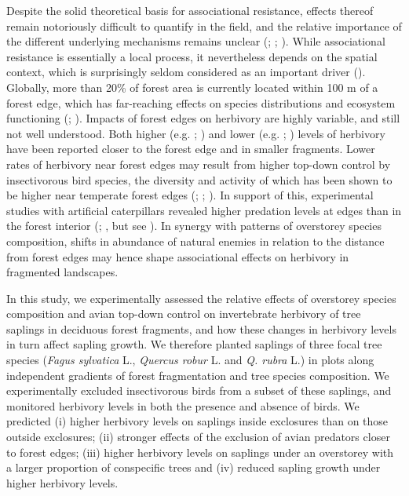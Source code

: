 \documentclass[b5paper,10pt]{book} %
\begin{document}
	Despite the solid theoretical basis for associational resistance, effects thereof remain notoriously difficult to quantify in the field, and the relative importance of the different underlying mechanisms remains unclear (\citealt{Barbosa2009}; \citealt{Muiruri2016}; \citealt{Grossman2018}). While associational resistance is essentially a local process, it nevertheless depends on the spatial context, which is surprisingly seldom considered as an important driver (\citealt{Nadrowski2010}). Globally, more than 20\% of forest area is currently located within 100 m of a forest edge, which has far-reaching effects on species distributions and ecosystem functioning (\citealt{Haddad2015}; \citealt{Pfeifer2017}). Impacts of forest edges on herbivory are highly variable, and still not well understood. Both higher (e.g. \citealt{Terborgh2006}; \citealt{Castagneyrol2019}) and lower (e.g. \citealt{Simonetti2007}; \citealt{Ruiz-Guerra2010}) levels of herbivory have been reported closer to the forest edge and in smaller fragments. Lower rates of herbivory near forest edges may result from higher top-down control by insectivorous bird species, the diversity and activity of which has been shown to be higher near temperate forest edges (\citealt{Terraube2016}; \citealt{Hofmeister2017}; \citealt{Melin2018}). In support of this, experimental studies with artificial caterpillars revealed higher predation levels at edges than in the forest interior (\citealt{Barbaro2014}; \citealt{Gonzalez-Gomez2017}, but see \citealt{Peter2015}). In synergy with patterns of overstorey species composition, shifts in abundance of natural enemies in relation to the distance from forest edges may hence shape associational effects on herbivory in fragmented landscapes. 

	In this study, we experimentally assessed the relative effects of overstorey species composition and avian top-down control on invertebrate herbivory of tree saplings in deciduous forest fragments, and how these changes in herbivory levels in turn affect sapling growth. We therefore planted saplings of three focal tree species (\textit{Fagus sylvatica} L., \textit{Quercus robur} L. and \textit{Q. rubra} L.) in plots along independent gradients of forest fragmentation and tree species composition. We experimentally excluded insectivorous birds from a subset of these saplings, and monitored herbivory levels in both the presence and absence of birds. We predicted (i) higher herbivory levels on saplings inside exclosures than on those outside exclosures; (ii) stronger effects of the exclusion of avian predators closer to forest edges; (iii) higher herbivory levels on saplings under an overstorey with a larger proportion of conspecific trees and (iv) reduced sapling growth under higher herbivory levels.
\end{document}
